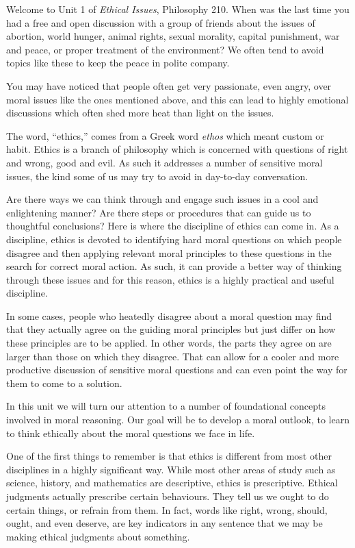 \documentclass[
]{book}
\begin{document}
Welcome to Unit 1 of \emph{Ethical Issues}, Philosophy 210. When was the last time you had a free and open discussion with a group of friends about the issues of abortion, world hunger, animal rights, sexual morality, capital punishment, war and peace, or proper treatment of the environment? We often tend to avoid topics like these to keep the peace in polite company.

You may have noticed that people often get very passionate, even angry, over moral issues like the ones mentioned above, and this can lead to highly emotional discussions which often shed more heat than light on the issues.

The word, ``ethics,'' comes from a Greek word \emph{ethos} which meant custom or habit. Ethics is a branch of philosophy which is concerned with questions of right and wrong, good and evil. As such it addresses a number of sensitive moral issues, the kind some of us may try to avoid in day-to-day conversation.

Are there ways we can think through and engage such issues in a cool and enlightening manner? Are there steps or procedures that can guide us to thoughtful conclusions? Here is where the discipline of ethics can come in. As a discipline, ethics is devoted to identifying hard moral questions on which people disagree and then applying relevant moral principles to these questions in the search for correct moral action. As such, it can provide a better way of thinking through these issues and for this reason, ethics is a highly practical and useful discipline.

In some cases, people who heatedly disagree about a moral question may find that they actually agree on the guiding moral principles but just differ on how these principles are to be applied. In other words, the parts they agree on are larger than those on which they disagree. That can allow for a cooler and more productive discussion of sensitive moral questions and can even point the way for them to come to a solution.

In this unit we will turn our attention to a number of foundational concepts involved in moral reasoning. Our goal will be to develop a moral outlook, to learn to think ethically about the moral questions we face in life.

One of the first things to remember is that ethics is different from most other disciplines in a highly significant way. While most other areas of study such as science, history, and mathematics are descriptive, ethics is prescriptive. Ethical judgments actually prescribe certain behaviours. They tell us we ought to do certain things, or refrain from them. In fact, words like right, wrong, should, ought, and even deserve, are key indicators in any sentence that we may be making ethical judgments about something.
\end{document}
